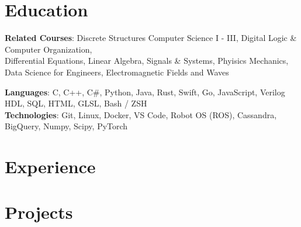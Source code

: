\documentclass[letterpaper,11pt]{article}
\begin{document}


\section{Education}
    \resumeSubHeadingListStart
        

        \begin{itemize}[leftmargin=0.15in, label={}]
            \small{\item{
                \textbf{Related Courses}{: 
                    Discrete Structures Computer Science I - III, 
                    Digital Logic \& Computer Organization, 
                    \\ \hspace{2.75cm}
                    Differential Equations, 
                    Linear Algebra,
                    Signals \& Systems, 
                    Phyisics Mechanics,
                    \\ \hspace{2.75cm}
                    Data Science for Engineers,
                    Electromagnetic Fields and Waves
                } \\
            }}
        \end{itemize}
    \resumeSubHeadingListEnd

\begin{itemize}[leftmargin=0.15in, label={}]
    \small{\item{
        \textbf{Languages}{: C, C++, C\#, Python, Java, Rust, Swift, Go, JavaScript, Verilog HDL, SQL, HTML, GLSL, Bash / ZSH} \\
        \textbf{Technologies}{: Git, Linux, Docker, VS Code, Robot OS (ROS), Cassandra, BigQuery, Numpy, Scipy, PyTorch} \\
    }}
\end{itemize}

\section{Experience}
    \resumeSubHeadingListStart
        
        
        
        
        
    \resumeSubHeadingListEnd

\section{Projects}
    \resumeSubHeadingListStart
        

        
    \resumeSubHeadingListEnd
\end{document}
